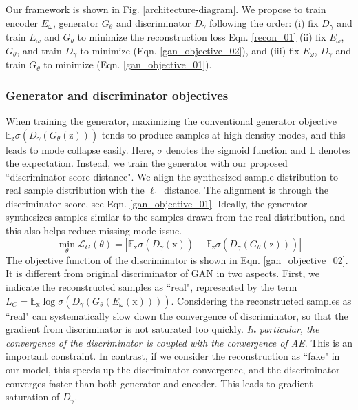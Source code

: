 \documentclass[runningheads]{llncs}
\begin{document}
Our framework is shown in Fig. \ref{architecture-diagram}.  We propose to train encoder $E_{\omega}$, generator $G_{\theta}$ and discriminator $D_{\gamma}$ following the order: (i) fix $D_{\gamma}$ and train $E_{\omega}$ and $G_{\theta}$ to minimize the reconstruction loss Eqn. \ref{recon_01} (ii) fix $E_{\omega}$, $G_{\theta}$, and train $D_{\gamma}$ to minimize (Eqn. \ref{gan_objective_02}), and (iii) fix $E_{\omega}$, $D_{\gamma}$ and train $G_{\theta}$ to minimize (Eqn. \ref{gan_objective_01}).
\subsubsection{Generator and discriminator objectives}
When training the generator, maximizing the conventional generator objective $\mathbb{E}_{\mathrm{z}} \sigma (D_\gamma(G_\theta(\mathrm{z})))$ \cite{goodfellow-nisp-2014} tends to produce samples at high-density modes, and this leads to mode collapse easily. Here, $\sigma$ denotes the sigmoid function and $\mathbb{E}$ denotes the expectation. Instead, we train the generator with our proposed ``discriminator-score distance". We align the  synthesized sample distribution to real sample distribution with the $\ell_1$ distance.  The alignment is through the discriminator score, see Eqn. \ref{gan_objective_01}. Ideally, the generator synthesizes samples similar to the samples drawn from the real distribution, and this also helps reduce missing mode issue.
\begin{equation}
\min_{\theta}\mathcal{L}_G(\theta) = |\mathbb{E}_{\mathrm{x}} \sigma (D_\gamma(\mathrm{x})) - \mathbb{E}_{\mathrm{z}} \sigma (D_\gamma(G_\theta(\mathrm{z})))|
\label{gan_objective_01}
\end{equation}
The objective function of the discriminator is shown in Eqn. \ref{gan_objective_02}. It is different from original discriminator of GAN in two aspects. First, we indicate the reconstructed samples as ``real", represented by the term $L_C = \mathbb{E}_{\mathrm{x}} \log \sigma (D_\gamma(G_\theta(E_\omega(\mathrm{x}))))$. Considering the reconstructed samples as ``real" can  systematically slow down the convergence of discriminator, so that the gradient from discriminator is not saturated too quickly. {\em In particular, the convergence of the discriminator is coupled with the convergence of AE}. This is  an important constraint. In contrast, if we consider the reconstruction as ``fake" in our model, this speeds up the discriminator convergence, and the discriminator converges faster than both generator and encoder. This leads to gradient saturation of $D_\gamma$. 
\end{document}
